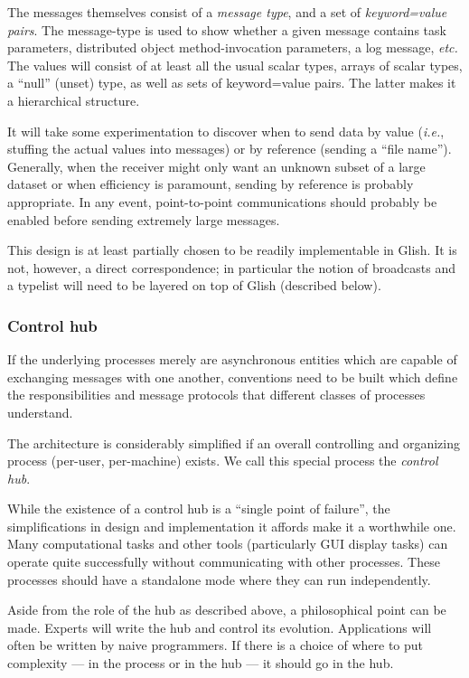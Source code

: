 The messages themselves consist of a {\em message type}, and a set of
{\em keyword=value pairs}. The message-type is used to show whether a
given message contains task parameters, distributed object
method-invocation parameters, a log message, {\em etc.} The values
will consist of at least all the usual scalar types, arrays of scalar
types, a ``null'' (unset) type, as well as sets of keyword=value
pairs. The latter makes it a hierarchical structure.

It will take some experimentation to discover when to send data by
value ({\em i.e.}, stuffing the actual values into messages) or by
reference (sending a ``file name''). Generally, when the receiver
might only want an unknown subset of a large dataset or when efficiency
is paramount, sending by reference is probably appropriate.  In any
event, point-to-point communications should probably be enabled before
sending extremely large messages.

This design is at least partially chosen to be readily implementable
in Glish. It is not, however, a direct correspondence; in particular
the notion of broadcasts and a typelist will need to be layered on top
of Glish (described below).

\subsubsection{Control hub}

If the underlying processes merely are asynchronous entities which are
capable of exchanging messages with one another, conventions need to
be built which define the responsibilities and message protocols that
different classes of processes understand.

The architecture is considerably simplified if an overall controlling
and organizing process (per-user, per-machine) exists. We call this
special process the {\em control hub}. 

While the existence of a control hub is a ``single point of failure'',
the simplifications in design and implementation it affords make it a
worthwhile one. Many computational tasks and other tools
(particularly GUI display tasks) can operate quite successfully
without communicating with other processes. These processes should
have a standalone mode where they can run independently.

Aside from the role of the hub as described above, a philosophical
point can be made. Experts will write the hub and control its
evolution.  Applications will often be written by naive
programmers. If there is a choice of where to put complexity --- in
the process or in the hub --- it should go in the hub.

